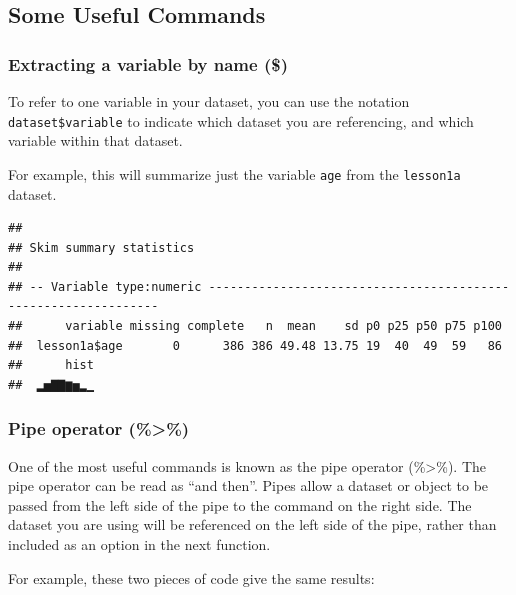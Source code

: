 \documentclass[]{book}
\newenvironment{Shaded}{\begin{snugshade}}{\end{snugshade}}
\newcommand{\KeywordTok}[1]{\textcolor[rgb]{0.13,0.29,0.53}{\textbf{#1}}}
\newcommand{\NormalTok}[1]{#1}
\newcommand{\OperatorTok}[1]{\textcolor[rgb]{0.81,0.36,0.00}{\textbf{#1}}}
\begin{document}
\hypertarget{some-useful-commands-1}{%
\subsection{Some Useful Commands}\label{some-useful-commands-1}}

\hypertarget{extracting-a-variable-by-name-1}{%
\subsubsection{Extracting a variable by name
(\$)}\label{extracting-a-variable-by-name-1}}

To refer to one variable in your dataset, you can use the notation
\texttt{dataset\$variable} to indicate which dataset you are
referencing, and which variable within that dataset.

For example, this will summarize just the variable \texttt{age} from the
\texttt{lesson1a} dataset.

\begin{Shaded}
\end{Shaded}

\begin{verbatim}
## 
## Skim summary statistics
## 
## -- Variable type:numeric ---------------------------------------------------------------
##      variable missing complete   n  mean    sd p0 p25 p50 p75 p100
##  lesson1a$age       0      386 386 49.48 13.75 19  40  49  59   86
##      hist
##  ▂▅▇▇▆▅▂▁
\end{verbatim}

\hypertarget{pipe-operator-1}{%
\subsubsection{Pipe operator (\%\textgreater\%)}\label{pipe-operator-1}}

One of the most useful commands is known as the pipe operator
(\%\textgreater\%). The pipe operator can be read as ``and then''. Pipes
allow a dataset or object to be passed from the left side of the pipe to
the command on the right side. The dataset you are using will be
referenced on the left side of the pipe, rather than included as an
option in the next function.

For example, these two pieces of code give the same results:
\end{document}

